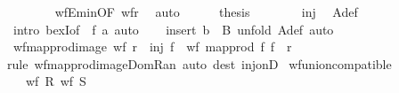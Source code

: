 \begin{isabellebody}
\ \ \ \ \ \ \isamarkupfalse%
\ wfE{\isacharunderscore}{\kern0pt}min{\isacharbrackleft}{\kern0pt}OF\ wf{\isacharunderscore}{\kern0pt}r{\isacharbrackright}{\kern0pt}\ \isamarkupfalse%
\ auto\isanewline
\ \ \ \ \isamarkupfalse%
\ {\isacharquery}{\kern0pt}thesis\isanewline
\ \ \ \ \ \ \isamarkupfalse%
\ inj\ \isamarkupfalse%
\ A{\isacharunderscore}{\kern0pt}def\isanewline
\ \ \ \ \ \ \isamarkupfalse%
\ {\isacharparenleft}{\kern0pt}intro\ bexI{\isacharbrackleft}{\kern0pt}of\ {\isacharunderscore}{\kern0pt}\ {\isachardoublequoteopen}f\ a{}{\isachardoublequoteclose}{\isacharbrackright}{\kern0pt}{\isacharparenright}{\kern0pt}\ auto\isanewline
\ \ \isamarkupfalse%
\ {\isacharparenleft}{\kern0pt}insert\ {\isacartoucheopen}b\ {\isasymin}\ B{\isacartoucheclose}{\isacharcomma}{\kern0pt}\ unfold\ A{\isacharunderscore}{\kern0pt}def{\isacharcomma}{\kern0pt}\ auto{\isacharparenright}{\kern0pt}\isanewline
{}\isamarkupfalse%
%
\endisatagproof
{\isafoldproof}%
%
\isadelimproof
\isanewline
%
\endisadelimproof
\isanewline
{}\isamarkupfalse%
\ wf{\isacharunderscore}{\kern0pt}map{\isacharunderscore}{\kern0pt}prod{\isacharunderscore}{\kern0pt}image{\isacharcolon}{\kern0pt}\ {\isachardoublequoteopen}wf\ r\ {\isasymLongrightarrow}\ inj\ f\ {\isasymLongrightarrow}\ wf\ {\isacharparenleft}{\kern0pt}map{\isacharunderscore}{\kern0pt}prod\ f\ f\ {\isacharbackquote}{\kern0pt}\ r{\isacharparenright}{\kern0pt}{\isachardoublequoteclose}\isanewline
%
\isadelimproof
%
\endisadelimproof
%
\isatagproof
{}\isamarkupfalse%
{\isacharparenleft}{\kern0pt}rule\ wf{\isacharunderscore}{\kern0pt}map{\isacharunderscore}{\kern0pt}prod{\isacharunderscore}{\kern0pt}image{\isacharunderscore}{\kern0pt}Dom{\isacharunderscore}{\kern0pt}Ran{\isacharparenright}{\kern0pt}\ {\isacharparenleft}{\kern0pt}auto\ dest{\isacharcolon}{\kern0pt}\ inj{\isacharunderscore}{\kern0pt}onD{\isacharparenright}{\kern0pt}%
\endisatagproof
{\isafoldproof}%
%
\isadelimproof
%
\endisadelimproof
%
\isadelimdocument
%
\endisadelimdocument
%
\isatagdocument
%
\isamarkuptrue%
%
\endisatagdocument
{\isafolddocument}%
%
\isadelimdocument
%
\endisadelimdocument
{}\isamarkupfalse%
\ wf{\isacharunderscore}{\kern0pt}union{\isacharunderscore}{\kern0pt}compatible{\isacharcolon}{\kern0pt}\isanewline
\ \ \ {\isachardoublequoteopen}wf\ R{\isachardoublequoteclose}\ {\isachardoublequoteopen}wf\ S{\isachardoublequoteclose}\isanewline

\end{isabellebody}
